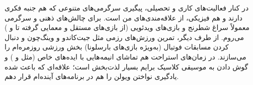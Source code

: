 

\begin{cvparagraph}

در کنار فعالیت‌های کاری و تحصیلی، پیگیری سرگرمی‌های متنوعی که هم جنبه فکری دارند و هم فیزیکی، از علاقه‌مندی‌های من است. برای چالش‌های ذهنی و سرگرمی معمولاً سراغ شطرنج و بازی‌های ویدئویی (از بازی‌های مستقل و معمایی گرفته تا  و ) می‌روم. از طرف دیگر، تمرین ورزش‌های رزمی مثل جیت‌کاندو و وینگ‌چون و دنبال کردن مسابقات فوتبال (به‌ویژه بازی‌های بارسلونا) بخش ورزشی روزمره‌ام را می‌سازند. در زمان‌های استراحت هم تماشای انیمه‌هایی با ایده‌های خاص (مثل  و ) و گوش دادن به موسیقی کلاسیک برایم بسیار لذت‌بخش است؛ علاقه‌ای که باعث شده یادگیری نواختن ویولن را هم در برنامه‌های آینده‌ام قرار دهم.
\end{cvparagraph}
